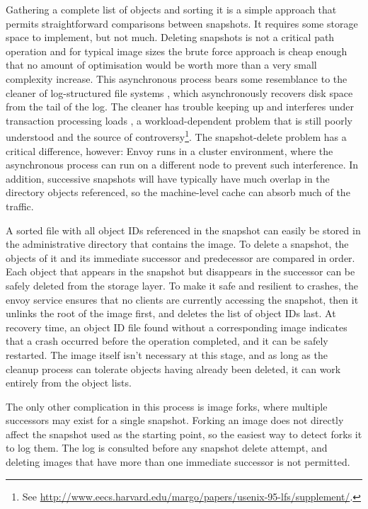 Gathering a complete list of objects and sorting it is a simple approach that permits straightforward comparisons between snapshots. It requires some storage space to implement, but not much. Deleting snapshots is not a critical path operation and for typical image sizes the brute force approach is cheap enough that no amount of optimisation would be worth more than a very small complexity increase. This asynchronous process bears some resemblance to the cleaner of log-structured file systems \cite{rosenblum}, which asynchronously recovers disk space from the tail of the log. The cleaner has trouble keeping up and interferes under transaction processing loads \cite{seltzer93,seltzer95}, a workload-dependent problem that is still poorly understood and the source of controversy\footnote{See \url{http://www.eecs.harvard.edu/margo/papers/usenix-95-lfs/supplement/}.}. The snapshot-delete problem has a critical difference, however: Envoy runs in a cluster environment, where the asynchronous process can run on a different node to prevent such interference. In addition, successive snapshots will have typically have much overlap in the directory objects referenced, so the machine-level cache can absorb much of the traffic.

A sorted file with all object IDs referenced in the snapshot can easily be stored in the administrative directory that contains the image. To delete a snapshot, the objects of it and its immediate successor and predecessor are compared in order. Each object that appears in the snapshot but disappears in the successor can be safely deleted from the storage layer. To make it safe and resilient to crashes, the envoy service ensures that no clients are currently accessing the snapshot, then it unlinks the root of the image first, and deletes the list of object IDs last. At recovery time, an object ID file found without a corresponding image indicates that a crash occurred before the operation completed, and it can be safely restarted. The image itself isn't necessary at this stage, and as long as the cleanup process can tolerate objects having already been deleted, it can work entirely from the object lists.

The only other complication in this process is image forks, where multiple successors may exist for a single snapshot. Forking an image does not directly affect the snapshot used as the starting point, so the easiest way to detect forks it to log them. The log is consulted before any snapshot delete attempt, and deleting images that have more than one immediate successor is not permitted.


